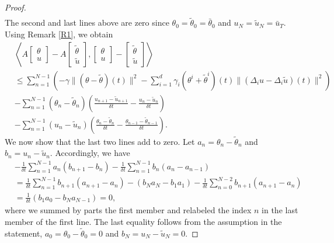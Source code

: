 \documentclass[12pt]{amsart}
\newcommand{\1}{{\chi}}
\newcommand{\lb}{\left(}
\newcommand{\rb}{\right)}
\theoremstyle{definition}
\begin{document}
\begin{proof}
\begin{align*}
        \end{align*}
        The second and last lines above are zero since $\theta_0=\tilde \theta_0=\bar \theta_0$ and $u_{N}=\tilde u_{N}=\bar u_T$.
        Using Remark \ref{R1}, we obtain
        \begin{align*}
                                &\left\langle A\left[\begin{array}{c}
                                \theta\\
                                u
                                \end{array}\right]-A\left[\begin{array}{c}
                                \tilde\theta\\
                                \tilde u
                                \end{array}\right],\left[\begin{array}{c}
                                \theta\\
                                u
                                \end{array}\right]-\left[\begin{array}{c}
                                \tilde\theta\\
                                \tilde u
                                \end{array}\right]\right\rangle \\
                &\leq \sum_{n=1}^{N-1} \lb -\gamma \|(\theta- \tilde \theta)(t) \|^2 - \sum_{i=1}^d \gamma_i (\theta^i + \tilde \theta^i)(t) \| (\Delta_i u - \Delta_i \tilde u)(t) \|^2 \rb \\
                &- \sum_{n=1}^{N-1} (\theta_n-\tilde\theta_n) \lb \frac{u_{n+1}-\tilde u_{n+1}}{\delta t} - \frac{u_n-\tilde u_n}{\delta t} \rb\\
                &- \sum_{n=1}^{N-1} (u_n-\tilde u_n) \lb\frac{\theta_n -\tilde \theta_n}{\delta t}-\frac{\theta_{n-1}-\tilde \theta_{n-1}}{\delta t}\rb.
        \end{align*}
        We now show that the last two lines add to zero.
        Let $a_n = \theta_n-\tilde \theta_n$ and $b_n = u_n-\tilde u_n$.
                Accordingly, we have
        \begin{align*}
                &-\frac{1}{\delta t} \sum_{n=1}^{N-1} a_n(b_{n+1}-b_n) - \frac{1}{\delta t} \sum_{n=1}^{N-1} b_n (a_n-a_{n-1}) \\
                &=\frac{1}{\delta t} \sum_{n=1}^{N-1} b_{n+1}(a_{n+1}-a_n) - (b_N a_N - b_1 a_1) - \frac{1}{\delta t} \sum_{n=0}^{N-2} b_{n+1} (a_{n+1}-a_n)\\
                &=\frac{1}{\delta t}(b_1a_0-b_Na_{N-1}) = 0,
        \end{align*}
        where we summed by parts the first member and relabeled the index $n$ in the last member of the first line.
        The last equality follows from the assumption in the statement, $a_0=\theta_0-\tilde \theta_0 = 0$ and $b_N = u_N-\tilde u_N = 0$.     
\end{proof}     
\end{document}
